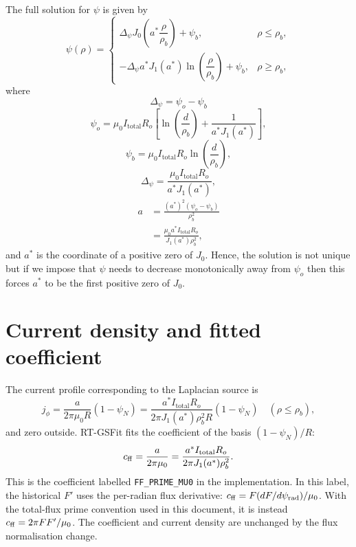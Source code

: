 \documentclass{article}
\begin{document}
The full solution for $\psi$ is given by
\[
\psi(\rho) = \begin{cases}
\Delta_\psi J_0\left(a^*\dfrac{\rho}{\rho_b}\right) + \psi_b, &\rho\le\rho_b, \\
-\Delta_\psi a^*J_1(a^*)\ln\left(\dfrac{\rho}{\rho_b}\right) + \psi_b, & \rho\ge\rho_b,
\end{cases}
\]
where
\[\Delta_\psi = \psi_o - \psi_b\]
\[\psi_o = \mu_0I_\text{total}R_o\left[\ln\left(\frac{d}{\rho_b}\right)+\frac{1}{a^*J_1(a^*)}\right],\]
\[\psi_b = \mu_0I_\text{total}R_o\ln\left(\frac{d}{\rho_b}\right),\]
\[\Delta_\psi = \frac{\mu_0I_\text{total}R_o}{a^* J_1(a^*)},\]
\[\begin{aligned}
a &= \frac{(a^*)^2(\psi_o-\psi_b)}{\rho_b^2} \\
&= \frac{\mu_0 a^* I_\text{total}R_o}{J_1(a^*)\rho_b^2},
\end{aligned}\]
and $a^*$ is the coordinate of a positive zero of $J_0$. Hence, the solution is not unique but if we impose that $\psi$ needs to decrease monotonically away from $\psi_o$ then this forces $a^*$ to be the first positive zero of $J_0$.

\section{Current density and fitted coefficient}

The current profile corresponding to the Laplacian source is
\[
j_\phi=\frac{a}{2\pi\mu_0R}(1-\psi_N)
=\frac{a^*I_\text{total}R_o}{2\pi J_1(a^*)\rho_b^2R}(1-\psi_N)
\quad (\rho\leq\rho_b),
\]
and zero outside. RT-GSFit fits the coefficient of the basis $(1-\psi_N)/R$:
\[
c_{\rm ff}=\frac{a}{2\pi\mu_0}
=\frac{a^*I_\text{total}R_o}{2\pi J_1(a^*)\rho_b^2}.
\]
This is the coefficient labelled \texttt{FF\_PRIME\_MU0} in the implementation.
In this label, the historical $F'$ uses the per-radian flux derivative:
$c_{\rm ff}=F(dF/d\psi_{\rm rad})/\mu_0$.
With the total-flux prime convention used in this document, it is instead
$c_{\rm ff}=2\pi FF'/\mu_0$.
The coefficient and current density are unchanged by the flux normalisation change.

\end{document}
